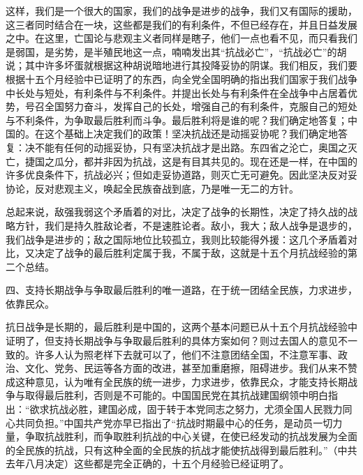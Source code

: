 这样，我们是一个很大的国家，我们的战争是进步的战争，我们又有国际的援助，这三者同时结合在一块，这些都是我们的有利条件，不但已经存在，并且日益发展之中。在这里，亡国论与悲观主义者同样是瞎子，他们一点也看不见，而只看我们是弱国，是劣势，是半殖民地这一点，喃喃发出其“抗战必亡”，“抗战必亡”的胡说；其中许多坏蛋就根据这种胡说暗地进行其投降妥协的阴谋。我们相反，我们要根据十五个月经验中已证明了的东西，向全党全国明确的指出我们国家于我们战争中长处与短处，有利条件与不利条件。并提出长处与有利条件在全战争中占居着优势，号召全国努力奋斗，发挥自己的长处，增强自己的有利条件，克服自己的短处与不利条件，为争取最后胜利而斗争。最后胜利将是谁的呢？我们确定地答复；中国的。在这个基础上决定我们的政策！坚决抗战还是动摇妥协呢？我们确定地答复：决不能有任何的动摇妥协，只有坚决抗战才是出路。东四省之沦亡，奥国之灭亡，捷国之瓜分，都并非因为抗战，这是有目其共见的。现在还是一样，在中国的许多优良条件下，抗战必兴；但如走妥协道路，则灭亡无可避免。因此坚决反对妥协论，反对悲观主义，唤起全民族奋战到底，乃是唯一无二的方针。

总起来说，敌强我弱这个矛盾着的对比，决定了战争的长期性，决定了持久战的战略方针，我们是持久胜敌论者，不是速胜论者。敌小，我大；敌人战争是退步的，我们战争是进步的；敌之国际地位比较孤立，我则比较能得外援：这几个矛盾着对比，又决定了战争的最后胜利定属于我，不属于敌，这就是十五个月抗战经验的第二个总结。

四、支持长期战争与争取最后胜利的唯一道路，在于统一团结全民族，力求进步，依靠民众。

抗日战争是长期的，最后胜利是中国的，这两个基本问题已从十五个月抗战经验中证明了，但支持长期战争与争取最后胜利的具体方案如何？则过去国人的意见不一致的。许多人认为照老样下去就可以了，他们不注意团结全国，不注意军事、政治、文化、党务、民运等各方面的改进，甚至加重磨擦，阻碍进步。我们从来不赞成这种意见，认为唯有全民族的统一进步，力求进步，依靠民众，才能支持长期战争与取得最后胜利，否则是不可能的。中国国民党在其抗战建国纲领中明白指出：“欲求抗战必胜，建国必成，固于转于本党同志之努力，尤须全国人民戮力同心共同负担。”中国共产党亦早已指出了“抗战时期最中心的任务，是动员一切力量，争取抗战胜利，而争取胜利抗战的中心关键，在使已经发动的抗战发展为全面的全民族的抗战，只有这种全面的全民族的抗战才能使抗战得到最后胜利。”（中共去年八月决定）这些都是完全正确的，十五个月经验已经证明了。


